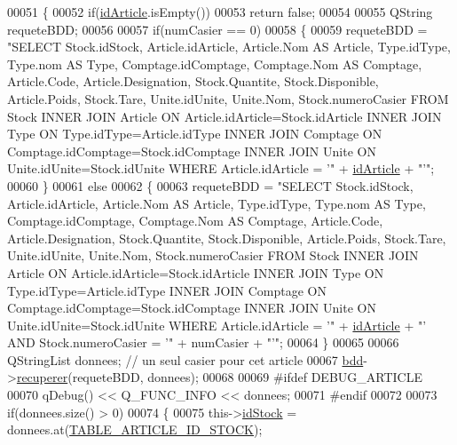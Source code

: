 \begin{DoxyCode}
00051 \{
00052     \textcolor{keywordflow}{if}(\hyperlink{class_article_a9f2f7a04139f26accec145066a5aacae}{idArticle}.isEmpty())
00053         \textcolor{keywordflow}{return} \textcolor{keyword}{false};
00054 
00055     QString requeteBDD;
00056 
00057     \textcolor{keywordflow}{if}(numCasier == 0)
00058     \{
00059         requeteBDD = \textcolor{stringliteral}{"SELECT Stock.idStock, Article.idArticle, Article.Nom AS Article, Type.idType,
       Type.nom AS Type, Comptage.idComptage, Comptage.Nom AS Comptage, Article.Code, Article.Designation, Stock.Quantite,
       Stock.Disponible, Article.Poids, Stock.Tare, Unite.idUnite, Unite.Nom, Stock.numeroCasier FROM Stock INNER
       JOIN Article ON Article.idArticle=Stock.idArticle INNER JOIN Type ON Type.idType=Article.idType INNER JOIN
       Comptage ON Comptage.idComptage=Stock.idComptage INNER JOIN Unite ON Unite.idUnite=Stock.idUnite WHERE
       Article.idArticle = '"} + \hyperlink{class_article_a9f2f7a04139f26accec145066a5aacae}{idArticle} + \textcolor{stringliteral}{"'"};
00060     \}
00061     \textcolor{keywordflow}{else}
00062     \{
00063         requeteBDD = \textcolor{stringliteral}{"SELECT Stock.idStock, Article.idArticle, Article.Nom AS Article, Type.idType,
       Type.nom AS Type, Comptage.idComptage, Comptage.Nom AS Comptage, Article.Code, Article.Designation, Stock.Quantite,
       Stock.Disponible, Article.Poids, Stock.Tare, Unite.idUnite, Unite.Nom, Stock.numeroCasier FROM Stock INNER
       JOIN Article ON Article.idArticle=Stock.idArticle INNER JOIN Type ON Type.idType=Article.idType INNER JOIN
       Comptage ON Comptage.idComptage=Stock.idComptage INNER JOIN Unite ON Unite.idUnite=Stock.idUnite WHERE
       Article.idArticle = '"} + \hyperlink{class_article_a9f2f7a04139f26accec145066a5aacae}{idArticle} + \textcolor{stringliteral}{"' AND Stock.numeroCasier = '"} + numCasier + \textcolor{stringliteral}{"'"};
00064     \}
00065 
00066     QStringList donnees; \textcolor{comment}{// un seul casier pour cet article}
00067     \hyperlink{class_article_a7221cec4212d86d74f479b9ee683ee8a}{bdd}->\hyperlink{class_bdd_a8f25d29d309041bbf875700db0efd97b}{recuperer}(requeteBDD, donnees);
00068 
00069 \textcolor{preprocessor}{    #ifdef DEBUG\_ARTICLE}
00070         qDebug() << Q\_FUNC\_INFO << donnees;
00071 \textcolor{preprocessor}{    #endif}
00072 
00073     \textcolor{keywordflow}{if}(donnees.size() > 0)
00074     \{
00075         this->\hyperlink{class_article_afb7785930598d5fbdafb707acdd3eec1}{idStock} = donnees.at(\hyperlink{_article_8h_a159354683cfd6e1b578172fbe6490ab6acfb8962aaa35363f43d27a9f6f1ae265}{TABLE\_ARTICLE\_ID\_STOCK});

\end{DoxyCode}
